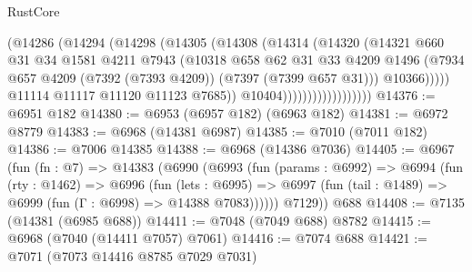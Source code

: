 \begin{lexlean}{RustCore}
\begin{coremodule}
                                    (@14286
                                      (@14294
                                        (@14298
                                          (@14305
                                            (@14308
                                              (@14314
                                                (@14320
                                                  (@14321
                                                    @660
                                                    @31
                                                    @34
                                                    @1581
                                                    @4211
                                                    @7943
                                                    (@10318
                                                      @658
                                                      @62
                                                      @31
                                                      @33
                                                      @4209
                                                      @1496
                                                      (@7934
                                                        @657
                                                        @4209
                                                        (@7392 (@7393 @4209))
                                                        (@7397 (@7399 @657 @31)))
                                                      @10366)))))
                                            @11114
                                            @11117
                                            @11120
                                            @11123
                                            @7685))
                                        @10404))))))))))))))))))
@14376 := @6951 @182
@14380 := @6953 (@6957 @182) (@6963 @182)
@14381 := @6972 @8779
@14383 := @6968 (@14381 @6987)
@14385 := @7010 (@7011 @182)
@14386 := @7006 @14385
@14388 := @6968 (@14386 @7036)
@14405 := @6967
    (fun (fn : @7) =>
    @14383
      (@6990
        (@6993
          (fun (params : @6992) =>
          @6994
            (fun (rty : @1462) =>
            @6996
              (fun (lets : @6995) =>
              @6997 (fun (tail : @1489) => @6999 (fun (Γ : @6998) => @14388 @7083))))))
        @7129))
    @688
@14408 := @7135 (@14381 (@6985 @688))
@14411 := @7048 (@7049 @688) @8782
@14415 := @6968 (@7040 (@14411 @7057) @7061)
@14416 := @7074 @688
@14421 := @7071 (@7073 @14416 @8785 @7029 @7031)

\end{coremodule}
\end{lexlean}
